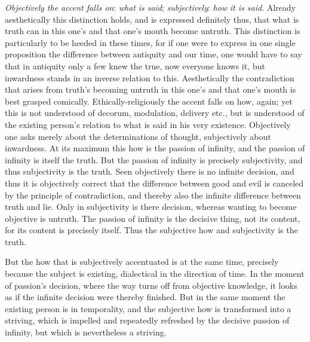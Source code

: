 \documentclass[12pt,a4paper,openany]{book}
\newcommand{\opage}[1]{\marginnote{\footnotesize\textit{[#1]}}}
\begin{document}
\emph{Objectively the accent falls on}: \textit{\emph{what}} \emph{is said};
\emph{subjectively}: \emph{how} \emph{it is said}. Already aesthetically
this distinction holds, and is expressed definitely thus,
that what is truth can in this one's and that one's mouth become
untruth. This distinction is particularly to be heeded in these times, for if one were
to express in one single proposition the difference between antiquity and our time,
one would have to say that in antiquity only a few knew the true, now everyone
knows it, but inwardness stands in an inverse relation to this.
Aesthetically the contradiction that arises from truth's becoming untruth in this
one's and that one's mouth is best grasped comically.
Ethically-religiously the accent falls on how, again; yet this is not understood of
decorum, modulation, delivery etc., but is understood of the existing person's
relation to what is said in his very existence. Objectively one asks merely about the
determinations of thought, subjectively about inwardness. At its maximum this how is
the passion of infinity, and the passion of infinity is itself the truth. But the
passion of infinity is precisely subjectivity, and thus subjectivity is the truth.
Seen objectively there is no infinite decision, and thus it is objectively correct that
the difference between good and evil is canceled by the principle of contradiction,
and thereby also the infinite difference between truth and lie. Only in subjectivity
is there decision, whereas wanting to become objective is untruth. The passion of
infinity is the decisive thing, not its content, for its content is precisely itself.
Thus the subjective how and subjectivity is the truth.

But the how that is subjectively accentuated is at the same time,
\setcounter{footnote}{0}%
\opage{188}precisely because the subject is existing, dialectical in the direction of
time. In the moment of passion's decision, where the way turns off from objective
knowledge, it looks as if the infinite decision were thereby finished. But in the same
moment the existing person is in temporality, and the subjective how is transformed
into a striving, which is impelled and repeatedly refreshed by the decisive passion of
infinity, but which is nevertheless a striving.
\end{document}
